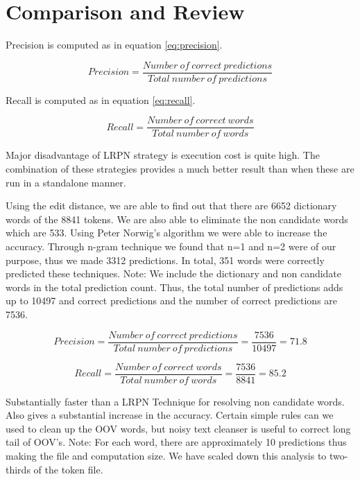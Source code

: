 \section{Comparison and Review}
\label{sec-somethingnew}

Precision is computed as in equation \eqref{eq:precision}.

\begin{equation}
\label{eq:precision}
Precision = \frac{\mathit{Number\ of\ correct\ predictions}}{\mathit{Total\ number\ of\ predictions}}
\end{equation}

Recall is computed as in equation \eqref{eq:recall}.

\begin{equation}
\label{eq:recall}
Recall = \frac{\mathit{Number\ of\ correct\ words}}{\mathit{Total\ number\ of\ words}}
\end{equation}


 Major disadvantage of LRPN strategy is execution cost is quite high. The combination of these strategies provides a much better result than when these are run in a standalone manner.

Using the edit distance, we are able to find out that there are 6652 dictionary words of the 8841 tokens. We are also able to eliminate the non candidate words which are 533. Using Peter Norwig's algorithm we were able to increase the accuracy. Through n-gram technique we found that n=1 and n=2 were of our purpose, thus we made 3312 predictions. In total, 351 words were correctly predicted these techniques. Note: We include the dictionary and non candidate words in the total prediction count. Thus, the total number of predictions adds up to 10497 and correct predictions and the number of correct predictions are 7536.

\begin{equation}
\label{eq:pre}
Precision = \frac{\mathit{Number\ of\ correct\ predictions}}{\mathit{Total\ number\ of\ predictions}} = \frac{\mathit{7536}}{\mathit{10497}} ={{71.8}}
\end{equation}

\begin{equation}
\label{eq:rec}
Recall = \frac{\mathit{Number\ of\ correct\ words}}{\mathit{Total\ number\ of\ words}} = \frac{\mathit{7536}}{\mathit{8841}} ={{85.2}}
\end{equation}
  
 Substantially faster than a LRPN Technique for resolving non candidate words. Also gives a substantial increase in the accuracy.  Certain simple rules can we used to clean up the OOV words, but noisy text cleanser is useful to correct long tail of OOV's. Note: For each word, there are approximately 10 predictions thus making the file and computation size. We have scaled down this analysis to two-thirds of the token file. 

